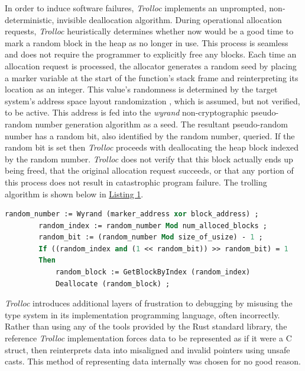 \documentclass{article}
\begin{document}
In order to induce software failures, \textit{Trolloc} implements an unprompted, non-deterministic, invisible deallocation algorithm. During operational allocation requests, \textit{Trolloc} heuristically determines whether now would be a good time to mark a random block in the heap as no longer in use. This process is seamless and does not require the programmer to explicitly free any blocks. Each time an allocation request is processed, the allocator generates a random seed by placing a marker variable at the start of the function's stack frame and reinterpreting its location as an integer. This value's randomness is determined by the target system's address space layout randomization \cite{aslrwiki}, which is assumed, but not verified, to be active. This address is fed into the \textit{wyrand} non-cryptographic pseudo-random number generation algorithm \cite{wyrand} as a seed. The resultant pseudo-random number has a random bit, also identified by the random number, queried. If the random bit is set then \textit{Trolloc} proceeds with deallocating the heap block indexed by the random number. \textit{Trolloc} does not verify that this block actually ends up being freed, that the original allocation request succeeds, or that any portion of this process does not result in catastrophic program failure. The trolling algorithm is shown below in \hyperref[lst1:trolling]{Listing 1}.

\begin{lstlisting}[language=Pascal, caption=Trolling algorithm with egregious kerning.]
        random_number := Wyrand (marker_address xor block_address) ;
        random_index := random_number Mod num_alloced_blocks ;
        random_bit := (random_number Mod size_of_usize) - 1 ;
        If ((random_index and (1 << random_bit)) >> random_bit) = 1
        Then
            random_block := GetBlockByIndex (random_index)
            Deallocate (random_block) ;
\end{lstlisting}\label{lst1:trolling}

\textit{Trolloc} introduces additional layers of frustration to debugging by misusing the type system in its implementation programming language, often incorrectly. Rather than using any of the tools provided by the Rust standard library, the reference \textit{Trolloc} implementation forces data to be represented as if it were a C struct, then reinterprets data into misaligned and invalid pointers using unsafe casts. This method of representing data internally was chosen for no good reason. 
\end{document}
